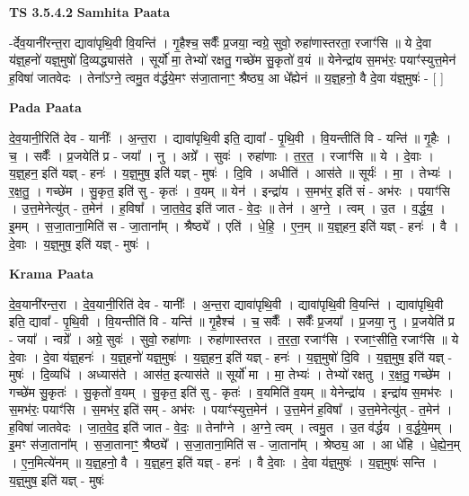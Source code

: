 \documentclass[17pt]{extarticle}
\begin{document}
\textbf{TS 3.5.4.2 } \newline
\textbf{Samhita Paata} \newline

-र्देव॒यानी॑रन्त॒रा द्यावा॑पृथि॒वी वि॒यन्ति॑ । गृ॒हैश्च॒ सर्वैः᳚ प्र॒जया॒ न्वग्रे॒ सुवो॒ रुहा॑णास्तरता॒ रजाꣳ॑सि ॥ ये दे॒वा य॑ज्ञ्॒हनो॑ यज्ञ्॒मुषो॑ दि॒व्यद्ध्यास॑ते । सूर्यो॑ मा॒ तेभ्यो॑ रक्षतु॒ गच्छे॑म सु॒कृतो॑ व॒यं ॥ येनेन्द्रा॑य स॒मभ॑रः॒ पयाꣳ॑स्युत्त॒मेन॑ ह॒विषा॑ जातवेदः । तेना᳚ऽग्ने॒ त्वमु॒त व॑र्द्धये॒मꣳ स॑जा॒तानाꣳ॒॒ श्रैष्ठ्य॒ आ धे᳚ह्येनं ॥ य॒ज्ञ्॒हनो॒ वै दे॒वा य॑ज्ञ्॒मुषः॑ - [  ] \newline

\textbf{Pada Paata} \newline

दे॒व॒यानी॒रिति॑ देव - यानीः᳚ । अ॒न्त॒रा । द्यावा॑पृथि॒वी इति॒ द्यावा᳚ - पृ॒थि॒वी । वि॒यन्तीति॑ वि - यन्ति॑ ॥ गृ॒हैः । च॒ । सर्वैः᳚ । प्र॒जयेति॑ प्र - जया᳚ । नु । अग्रे᳚ । सुवः॑ । रुहा॑णाः । त॒र॒त॒ । रजाꣳ॑सि ॥ ये । दे॒वाः । य॒ज्ञ्॒हन॒ इति॑ यज्ञ् - हनः॑ । य॒ज्ञ्॒मुष॒ इति॑ यज्ञ् - मुषः॑ । दि॒वि । अधीति॑ । आस॑ते ॥ सूर्यः॑ । मा॒ । तेभ्यः॑ । र॒क्ष॒तु॒ । गच्छे॑म । सु॒कृत॒ इति॑ सु - कृतः॑ । व॒यम् ॥ येन॑ । इन्द्रा॑य । स॒मभ॑र॒ इति॑ सं - अभ॑रः । पयाꣳ॑सि । उ॒त्त॒मेनेत्यु॑त् - त॒मेन॑ । ह॒विषा᳚ । जा॒त॒वे॒द॒ इति॑ जात - वे॒दः॒ ॥ तेन॑ । अ॒ग्ने॒ । त्वम् । उ॒त । व॒र्द्ध॒य॒ । इ॒मम् । स॒जा॒ताना॒मिति॑ स - जा॒ताना᳚म् । श्रैष्ठ्ये᳚ । एति॑ । धे॒हि॒ । ए॒न॒म् ॥ य॒ज्ञ्॒हन॒ इति॑ यज्ञ् - हनः॑ । वै । दे॒वाः । य॒ज्ञ्॒मुष॒ इति॑ यज्ञ् - मुषः॑ ।  \newline


\textbf{Krama Paata} \newline

दे॒व॒यानी॑रन्त॒रा । दे॒व॒यानी॒रिति॑ देव - यानीः᳚ । अ॒न्त॒रा द्यावा॑पृथि॒वी । द्यावा॑पृथि॒वी वि॒यन्ति॑ । द्यावा॑पृथि॒वी इति॒ द्यावा᳚ - पृ॒थि॒वी । वि॒यन्तीति॑ वि - यन्ति॑ ॥ गृ॒हैश्च॑ । च॒ सर्वैः᳚ । सर्वैः᳚ प्र॒जया᳚ । प्र॒जया॒ नु । प्र॒जयेति॑ प्र - जया᳚ । न्वग्रे᳚ । अग्रे॒ सुवः॑ । सुवो॒ रुहा॑णाः । रुहा॑णास्तरत । त॒र॒ता॒ रजाꣳ॑सि । रजाꣳ॒॒सीति॒ रजाꣳ॑सि ॥ ये दे॒वाः । दे॒वा य॑ज्ञ्॒हनः॑ । य॒ज्ञ्॒हनो॑ यज्ञ्॒मुषः॑ । य॒ज्ञ्॒हन॒ इति॑ यज्ञ् - हनः॑ । य॒ज्ञ्॒मुषो॑ दि॒वि । य॒ज्ञ्॒मुष॒ इति॑ यज्ञ् - मुषः॑ । दि॒व्यधि॑ । अध्यास॑ते । आस॑त॒ इत्यास॑ते ॥ सूर्यो॑ मा । मा॒ तेभ्यः॑ । तेभ्यो॑ रक्षतु । र॒क्ष॒तु॒ गच्छे॑म । गच्छे॑म सु॒कृतः॑ । सु॒कृतो॑ व॒यम् । सु॒कृत॒ इति॑ सु - कृतः॑ । व॒यमिति॑ व॒यम् ॥ येनेन्द्रा॑य । इन्द्रा॑य स॒मभ॑रः । स॒मभ॑रः॒ पयाꣳ॑सि । स॒मभ॑र॒ इति॑ सम् - अभ॑रः । पयाꣳ॑स्युत्त॒मेन॑ । उ॒त्त॒मेन॑ ह॒विषा᳚ । उ॒त्त॒मेनेत्यु॑त् - त॒मेन॑ । ह॒विषा॑ जातवेदः । जा॒त॒वे॒द॒ इति॑ जात - वे॒दः॒ ॥ तेना᳚ग्ने । अ॒ग्ने॒ त्वम् । त्वमु॒त । उ॒त व॑र्द्धय । व॒र्द्ध॒ये॒मम् । इ॒मꣳ स॑जा॒ताना᳚म् । स॒जा॒तानाꣳ॒॒ श्रैष्ठ्ये᳚ । स॒जा॒ताना॒मिति॑ स - जा॒ताना᳚म् । श्रेष्ठ्य॒ आ । आ धे॑हि । धे॒ह्ये॒न॒म् । ए॒न॒मित्ये॑नम् ॥ य॒ज्ञ्॒हनो॒ वै । य॒ज्ञ्॒हन॒ इति॑ यज्ञ् - हनः॑ । वै दे॒वाः । दे॒वा य॑ज्ञ्॒मुषः॑ । य॒ज्ञ्॒मुषः॑ सन्ति । य॒ज्ञ्॒मुष॒ इति॑ यज्ञ् - मुषः॑ \newline
\end{document}

